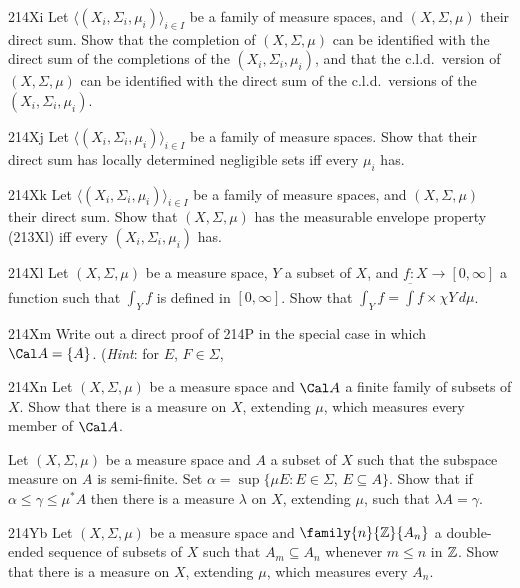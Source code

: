 {\sqheader 214Xi Let $\langle(X_i,\Sigma_i,\mu_i)\rangle_{i\in I}$ be a
family of measure spaces, and $(X,\Sigma,\mu)$ their direct sum.   Show
that the completion of $(X,\Sigma,\mu)$ can be identified with the
direct sum of the completions of the $(X_i,\Sigma_i,\mu_i)$, and that
the c.l.d.\ version of $(X,\Sigma,\mu)$ can be identified with the
direct sum of the c.l.d.\ versions of the $(X_i,\Sigma_i,\mu_i)$.

\spheader 214Xj Let
$\langle(X_i,\Sigma_i,\mu_i)\rangle_{i\in I}$ be a family of measure
spaces.   Show that their direct sum has
locally determined negligible sets iff every $\mu_i$ has.

\spheader 214Xk
Let $\langle(X_i,\Sigma_i,\mu_i)\rangle_{i\in I}$ be a family of measure
spaces, and $(X,\Sigma,\mu)$ their direct sum.   Show that
$(X,\Sigma,\mu)$ has the measurable envelope property (213Xl) iff every
$(X_i,\Sigma_i,\mu_i)$ has.

\spheader 214Xl
Let $(X,\Sigma,\mu)$ be a measure space, $Y$ a subset of
$X$, and $f:X\to[0,\infty]$
a function such that $\int_Yf$ is defined in $[0,\infty]$.
Show that $\int_Yf=\overline{\int}f\times\chi Y\,d\mu$.

\sqheader 214Xm
Write out a direct proof of 214P in the special case in which
$\Cal A=\{A\}$.   ({\it Hint\/}:  for $E$, $F\in\Sigma$,


\sqheader 214Xn
Let $(X,\Sigma,\mu)$ be a measure space and $\Cal A$ a finite family of
subsets of $X$.   Show that there is a measure on $X$,
extending $\mu$, which measures every member of $\Cal A$.

Let $(X,\Sigma,\mu)$ be a measure space and $A$ a subset of $X$
such that the subspace measure on $A$ is semi-finite.   Set
$\alpha=\sup\{\mu E:E\in\Sigma$, $E\subseteq A\}$.
Show that if $\alpha\le\gamma\le\mu^*A$ then there is a measure
$\lambda$ on $X$, extending $\mu$, such that $\lambda A=\gamma$.

\spheader 214Yb
Let $(X,\Sigma,\mu)$ be a measure space and
$\family{n}{\Bbb Z}{A_n}$ a double-ended sequence of subsets of $X$ such
that $A_m\subseteq A_n$ whenever $m\le n$ in $\Bbb Z$.   Show that there
is a measure on $X$, extending $\mu$, which measures every $A_n$.

}
